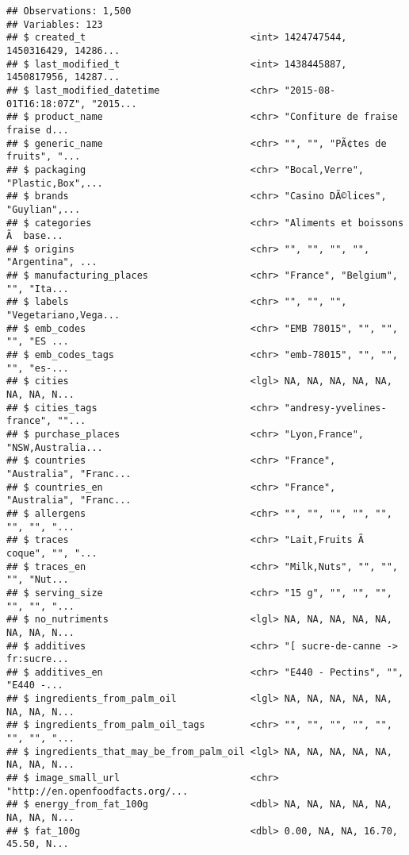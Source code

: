 \documentclass[]{article}
\begin{document}
\begin{verbatim}
## Observations: 1,500
## Variables: 123
## $ created_t                             <int> 1424747544, 1450316429, 14286...
## $ last_modified_t                       <int> 1438445887, 1450817956, 14287...
## $ last_modified_datetime                <chr> "2015-08-01T16:18:07Z", "2015...
## $ product_name                          <chr> "Confiture de fraise fraise d...
## $ generic_name                          <chr> "", "", "PÃ¢tes de fruits", "...
## $ packaging                             <chr> "Bocal,Verre", "Plastic,Box",...
## $ brands                                <chr> "Casino DÃ©lices", "Guylian",...
## $ categories                            <chr> "Aliments et boissons Ã  base...
## $ origins                               <chr> "", "", "", "", "Argentina", ...
## $ manufacturing_places                  <chr> "France", "Belgium", "", "Ita...
## $ labels                                <chr> "", "", "", "Vegetariano,Vega...
## $ emb_codes                             <chr> "EMB 78015", "", "", "", "ES ...
## $ emb_codes_tags                        <chr> "emb-78015", "", "", "", "es-...
## $ cities                                <lgl> NA, NA, NA, NA, NA, NA, NA, N...
## $ cities_tags                           <chr> "andresy-yvelines-france", ""...
## $ purchase_places                       <chr> "Lyon,France", "NSW,Australia...
## $ countries                             <chr> "France", "Australia", "Franc...
## $ countries_en                          <chr> "France", "Australia", "Franc...
## $ allergens                             <chr> "", "", "", "", "", "", "", "...
## $ traces                                <chr> "Lait,Fruits Ã  coque", "", "...
## $ traces_en                             <chr> "Milk,Nuts", "", "", "", "Nut...
## $ serving_size                          <chr> "15 g", "", "", "", "", "", "...
## $ no_nutriments                         <lgl> NA, NA, NA, NA, NA, NA, NA, N...
## $ additives                             <chr> "[ sucre-de-canne -> fr:sucre...
## $ additives_en                          <chr> "E440 - Pectins", "", "E440 -...
## $ ingredients_from_palm_oil             <lgl> NA, NA, NA, NA, NA, NA, NA, N...
## $ ingredients_from_palm_oil_tags        <chr> "", "", "", "", "", "", "", "...
## $ ingredients_that_may_be_from_palm_oil <lgl> NA, NA, NA, NA, NA, NA, NA, N...
## $ image_small_url                       <chr> "http://en.openfoodfacts.org/...
## $ energy_from_fat_100g                  <dbl> NA, NA, NA, NA, NA, NA, NA, N...
## $ fat_100g                              <dbl> 0.00, NA, NA, 16.70, 45.50, N...

\end{verbatim}
\end{document}
